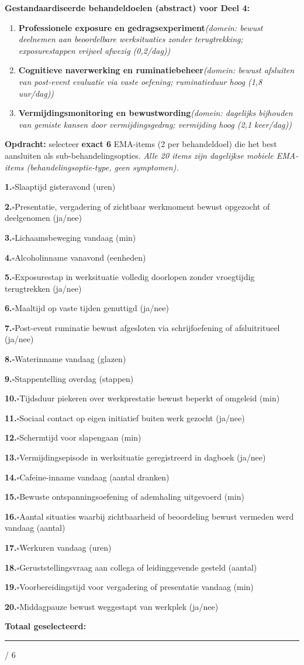 \documentclass[11pt,a4paper]{article}
\newcommand{\checkitemBFS}[2]{%
\noindent\small\textbf{#1.}\hspace{0.45em}$\square$\hspace{0.4em}#2\par\vspace{0.20em}}
\begin{document}
\begin{contextbox}
\small\textbf{Gestandaardiseerde behandeldoelen (abstract) voor Deel 4:}
\begin{enumerate}[topsep=2pt,itemsep=1pt,label=\arabic*.]
\item \textbf{Professionele exposure en gedragsexperiment}\quad\textit{\small (domein: bewust deelnemen aan beoordelbare werksituaties zonder terugtrekking; exposurestappen vrijwel afwezig (0,2/dag))}
\item \textbf{Cognitieve naverwerking en ruminatiebeheer}\quad\textit{\small (domein: bewust afsluiten van post-event evaluatie via vaste oefening; ruminatieduur hoog (1,8 uur/dag))}
\item \textbf{Vermijdingsmonitoring en bewustwording}\quad\textit{\small (domein: dagelijks bijhouden van gemiste kansen door vermijdingsgedrag; vermijding hoog (2,1 keer/dag))}
\end{enumerate}
\end{contextbox}

\begin{responsebox}
\small\textbf{Opdracht:} selecteer \textbf{exact 6} EMA-items (2 per behandeldoel) die het best aansluiten als sub-behandelingsopties.
\textit{Alle 20 items zijn dagelijkse mobiele EMA-items (behandelingsoptie-type, geen symptomen).}

\checkitemBFS{1}{Slaaptijd gisteravond (uren)}
\checkitemBFS{2}{Presentatie, vergadering of zichtbaar werkmoment bewust opgezocht of deelgenomen (ja/nee)}
\checkitemBFS{3}{Lichaamsbeweging vandaag (min)}
\checkitemBFS{4}{Alcoholinname vanavond (eenheden)}
\checkitemBFS{5}{Exposurestap in werksituatie volledig doorlopen zonder vroegtijdig terugtrekken (ja/nee)}
\checkitemBFS{6}{Maaltijd op vaste tijden genuttigd (ja/nee)}
\checkitemBFS{7}{Post-event ruminatie bewust afgesloten via schrijfoefening of afsluitritueel (ja/nee)}
\checkitemBFS{8}{Waterinname vandaag (glazen)}
\checkitemBFS{9}{Stappentelling overdag (stappen)}
\checkitemBFS{10}{Tijdsduur piekeren over werkprestatie bewust beperkt of omgeleid (min)}
\checkitemBFS{11}{Sociaal contact op eigen initiatief buiten werk gezocht (ja/nee)}
\checkitemBFS{12}{Schermtijd voor slapengaan (min)}
\checkitemBFS{13}{Vermijdingsepisode in werksituatie geregistreerd in dagboek (ja/nee)}
\checkitemBFS{14}{Cafeine-inname vandaag (aantal dranken)}
\checkitemBFS{15}{Bewuste ontspanningsoefening of ademhaling uitgevoerd (min)}
\checkitemBFS{16}{Aantal situaties waarbij zichtbaarheid of beoordeling bewust vermeden werd vandaag (aantal)}
\checkitemBFS{17}{Werkuren vandaag (uren)}
\checkitemBFS{18}{Geruststellingsvraag aan collega of leidinggevende gesteld (aantal)}
\checkitemBFS{19}{Voorbereidingstijd voor vergadering of presentatie vandaag (min)}
\checkitemBFS{20}{Middagpauze bewust weggestapt van werkplek (ja/nee)}
\vspace{0.4em}
\noindent\textbf{Totaal geselecteerd:}\hspace{0.5em}\rule{1.2cm}{0.25pt}\hspace{0.2em}/ 6
\end{responsebox}
\end{document}
